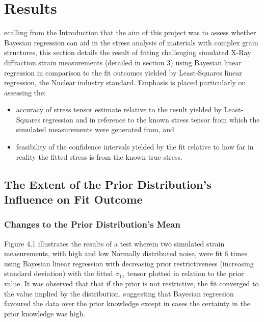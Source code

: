 %
%
\let\textcircled=\pgftextcircled
\chapter{Results}
\label{chap:intro}

ecalling from the Introduction that the aim of this project was to assess whether Bayesian regression can aid in the stress analysis of materials with complex grain structures, this section details the result of fitting challenging simulated X-Ray diffraction strain measurements (detailed in section 3) using Bayesian linear regression in comparison to the fit outcomes yielded by Least-Squares linear regression, the Nuclear industry standard. Emphasis is placed particularly on assessing the:

\begin{itemize}
    \item accuracy of stress tensor estimate relative to the result yielded by Least-Squares regression and in reference to the known stress tensor from which the simulated measurements were generated from,
and \item feasibility of the confidence intervals yielded by the fit relative to how far in reality the fitted stress is from the known true stress.
\end{itemize}

\section{The Extent of the Prior Distribution's Influence on Fit Outcome}
\label{subsec:subsec01}

\subsection{Changes to the Prior Distribution's Mean}
\label{subsec:subsec01}

Figure 4.1 illustrates the results of a test wherein two simulated strain measurements, with high and low Normally distributed noise, were fit 6 times using Bayesian linear regression with decreasing prior restrictiveness (increasing standard deviation) with the fitted $\sigma_{11}$ tensor plotted in relation to the prior value. It was observed that that if the prior is not restrictive, the fit converged to the value implied by the distribution, suggesting that Bayesian regression favoured the data over the prior knowledge except in cases the certainty in the prior knowledge was high.\\

